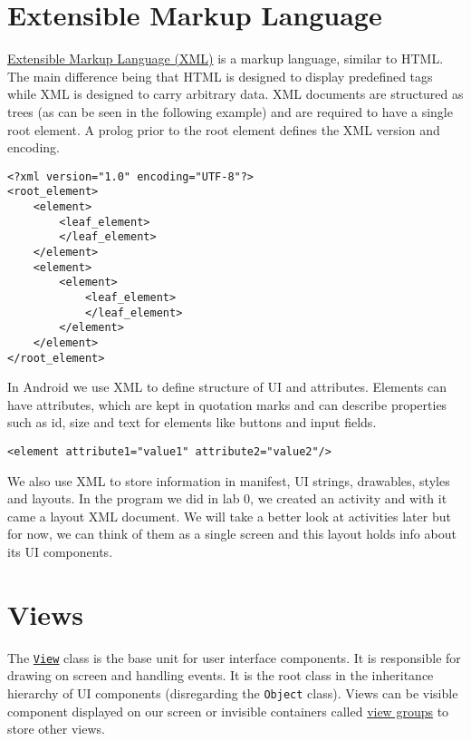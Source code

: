 \graphicspath{{./lab01/Images/}}


\maketocpage

\section{Extensible Markup Language}
\href{https://www.w3schools.com/xml/}{Extensible Markup Language (XML)} is a markup language, similar to HTML. The main difference being that HTML is designed to display predefined tags while XML is designed to carry arbitrary data. XML documents are structured as trees (as can be seen in the following example) and are required to have a single root element. A prolog prior to the root element defines the XML version and encoding.
\begin{lstlisting}[style=A_XML]
<?xml version="1.0" encoding="UTF-8"?>
<root_element>
    <element>
        <leaf_element>
        </leaf_element>
    </element>
    <element>
        <element>
            <leaf_element>
            </leaf_element>
        </element>
    </element>
</root_element>
\end{lstlisting}
In Android we use XML to define structure of UI and attributes. Elements can have attributes, which are kept in quotation marks and can describe properties such as id, size and text for elements like buttons and input fields.
\begin{lstlisting}[style=A_XML]
<element attribute1="value1" attribute2="value2"/>
\end{lstlisting}
We also use XML to store information in manifest, UI strings, drawables, styles and layouts. In the program we did in lab 0, we created an activity and with it came a layout XML document. We will take a better look at activities later but for now, we can think of them as a single screen and this layout holds info about its UI components.

\section{Views}
The \href{https://developer.android.com/reference/android/view/View.html}{\texttt{View}} class is the base unit for user interface components. It is responsible for drawing on screen and handling events. It is the root class in the inheritance hierarchy of UI components (disregarding the \texttt{Object} class). Views can be visible component displayed on our screen or invisible containers called \href{https://developer.android.com/reference/android/view/ViewGroup.html}{view groups} to store other views.

